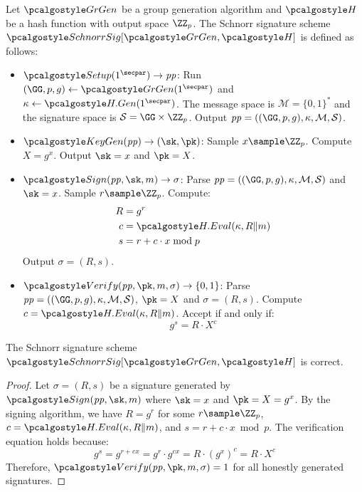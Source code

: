 \begin{definition}\label{def:schnorr}
  Let $\grgen$ be a group generation algorithm and $\algo{H}$ be a hash function with output space $\ZZ_p$. The Schnorr signature scheme $\algo{SchnorrSig}[\grgen, \algo{H}]$ is defined as follows:
  \begin{itemize}
    \item $\algo{Setup}(1^\secpar) \rightarrow \params$: Run $\gparam \gets \grgen(1^\secpar)$ and $\kappa \gets \algo{H.Gen}(1^\secpar)$. The message space is $\mathcal{M} = \{0,1\}^*$ and the signature space is $\mathcal{S} = \GG \times \ZZ_p$. Output $\params = (\gparam, \kappa, \mathcal{M}, \mathcal{S})$.
    
    \item $\algo{KeyGen}(\params) \rightarrow (\sk, \pk)$: Sample $x \sample \ZZ_p$. Compute $X = g^x$. Output $\sk = x$ and $\pk = X$.
    
    \item $\algo{Sign}(\params, \sk, m) \rightarrow \sigma$: Parse $\params = (\gparam, \kappa, \mathcal{M}, \mathcal{S})$ and $\sk = x$. Sample $r \sample \ZZ_p$. Compute:
    \begin{align*}
      R &= g^r \\
      c &= \algo{H.Eval}(\kappa, R \| m) \\
      s &= r + c \cdot x \bmod p
    \end{align*}
    Output $\sigma = (R, s)$.
    
    \item $\algo{Verify}(\params, \pk, m, \sigma) \rightarrow \{0, 1\}$: Parse $\params = (\gparam, \kappa, \mathcal{M}, \mathcal{S})$, $\pk = X$ and $\sigma = (R, s)$. Compute $c = \algo{H.Eval}(\kappa, R \| m)$. Accept if and only if:
    \[
      g^s = R \cdot X^c
    \]
  \end{itemize}
\end{definition}

\begin{lemma}\label{lem:schnorr-correctness}
  The Schnorr signature scheme\\ $\algo{SchnorrSig}[\grgen, \algo{H}]$ is correct.
\end{lemma}

\begin{proof}
  Let $\sigma = (R, s)$ be a signature generated by $\algo{Sign}(\params, \sk, m)$ where $\sk = x$ and $\pk = X = g^x$. By the signing algorithm, we have $R = g^r$ for some $r \sample \ZZ_p$, $c = \algo{H.Eval}(\kappa, R \| m)$, and $s = r + c \cdot x \bmod p$. The verification equation holds because:
  \[
    g^s = g^{r + cx} = g^r \cdot g^{cx} = R \cdot (g^x)^c = R \cdot X^c
  \]
  Therefore, $\algo{Verify}(\params, \pk, m, \sigma) = 1$ for all honestly generated signatures.
\end{proof}

